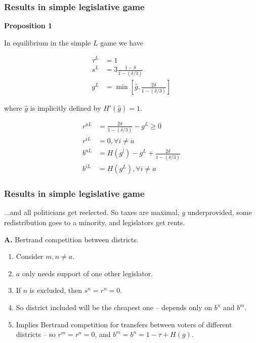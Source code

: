\documentclass[11pt,aspectratio=169]{beamer}
\begin{document}
\begin{frame}
\frametitle{Results in simple legislative game}

\noindent \textbf{Proposition 1}

\noindent In equilibrium in the simple $L$ game we have 

\vspace{-0.5cm}

\begin{align*}
\tau^L&=1 \\
s^L&=3\frac{1-\delta}{1-(\delta/3)} \\
g^L&=\min \left[ \hat{g},\frac{2\delta}{1-(\delta/3)} \right]
\end{align*}

where $\hat{g}$ is implicitly defined by $H'(\hat{g})=1$.

\vspace{-0.5cm}

\begin{align*}
r^{aL}&=\frac{2\delta}{1-(\delta/3)}-g^L\geq 0 \\
r^{iL}&=0, \forall i\neq a \\
b^{aL}&=H(g^l)-g^L+\frac{2\delta}{1-(\delta/3)} \\
b^{iL}&=H(g^L), \forall i\neq a
\end{align*}

\end{frame}


\begin{frame}\frametitle{Results in simple legislative game}

...and all politicians get reelected. So taxes are maximal, $g$ underprovided, some redistribution goes to a minority, and legislators get rents.

\bigskip

\textbf{A.} Bertrand competition between districts.

\begin{enumerate}
\item Consider $m, n \neq a$.
\item $a$ only needs support of one other legislator.
\item If $n$ is excluded, then $s^n = r^n = 0$.
\item So district included will be the cheapest one -- depends only on $b^n$ and $b^m$.
\item Implies Bertrand competition for transfers between voters of different districts -- so $r^m = r^n = 0$, and $b^m = b^n = 1-\tau+H(g)$.
\end{enumerate}

\end{frame}
\end{document}
